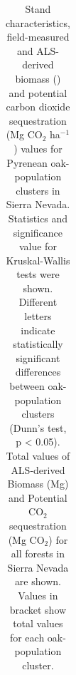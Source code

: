 \begin{table} 
\caption{Stand characteristics, field-measured and ALS-derived biomass (\mgha) and potential carbon dioxide sequestration (Mg CO$_2$ ha$^{-1}$) values for Pyrenean oak-population clusters in Sierra Nevada. Statistics and significance value for Kruskal-Wallis tests were shown. Different letters indicate statistically significant differences between oak-population clusters (Dunn’s test, p < 0.05). Total values of ALS-derived Biomass (Mg) and Potential CO$_2$ sequestration (Mg CO$_2$) for all \Qp forests in Sierra Nevada are shown. Values in bracket show total values for each oak-population cluster.}\label{tab:carbon:compara}
\begin{adjustbox}{width=\linewidth}
	\begin{threeparttable}
		\begin{tabular}{lclclclrrr} 


\end{tabular}
\end{threeparttable}
\end{adjustbox}
\end{table}
